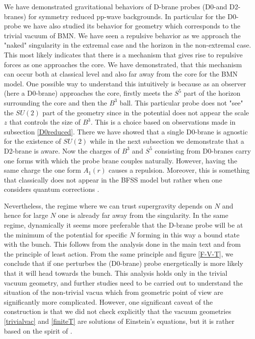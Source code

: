\documentclass[11pt,english]{article}
\numberwithin{equation}{section}
\begin{document}
We have demonstrated gravitational behaviors of D-brane probes (D0-and D2-branes) for symmetry reduced pp-wave backgrounds. In particular for the D0-probe we have also studied its behavior for geometry which corresponds to the trivial vacuum of BMN. We have seen a repulsive behavior as we approach the "naked" singularity in the extremal case and the horizon in the non-extremal case. This most likely indicates that there is a mechanism that gives rise to repulsive forces as one approaches the core. We have demonstrated, that this mechanism can occur both at classical level and also far away from the core for the BMN model.  One possible way to understand this intuitively is because as an observer (here a D0-brane) approaches the core, firstly meets the $S^5$ part of the horizon surrounding the core and then the $B^3$ ball. This particular probe does not "see" the $SU(2)$ part of the geometry since in the potential does not appear the scale $z$ that controls the size of $B^3$. This is a choice based on observations made in subsection \ref{D0reduced}. There we have showed that a single D0-brane is agnostic for the existence of $SU(2)$ while in the next subsection we demonstrate that a D2-brane is aware.   Now the charges of $B^3$ and $S^5$ consisting from D0-branes carry one forms with which the probe brane couples naturally. However, having the same charge the one form $A_1(r)$ causes a repulsion. Moreover, this is something that classically does not appear in the BFSS model but rather when one considers quantum corrections \cite{Hyakutake2014}.

 Nevertheless, the regime where we can trust supergravity depends on $N$ and hence for large $N$ one is already far away from the singularity.  In the same regime,  dynamically it seems more preferable that the D-brane probe will be at the minimum of the potential for specific $N$ forming in this way a bound state with the bunch. This follows from the analysis done in the main text and from the principle of least action.  From the same principle and figure \ref{F-V-T}, we conclude that if one perturbes the (D0-brane) probe energetically is more likely that it will head towards the bunch. This analysis holds only in the trivial vacuum geometry, and further studies need to be carried out to understand the situation of the non-trivial vacua which from geometric point of view are significantly more complicated. However, one significant caveat of the construction is that we did not check explicitly that the vacuum geometries \eqref{trivialvac} and \eqref{finiteT} are solutions of Einstein's equations, but it is rather based on the spirit of \cite{Lin2006}.
 
\end{document}
